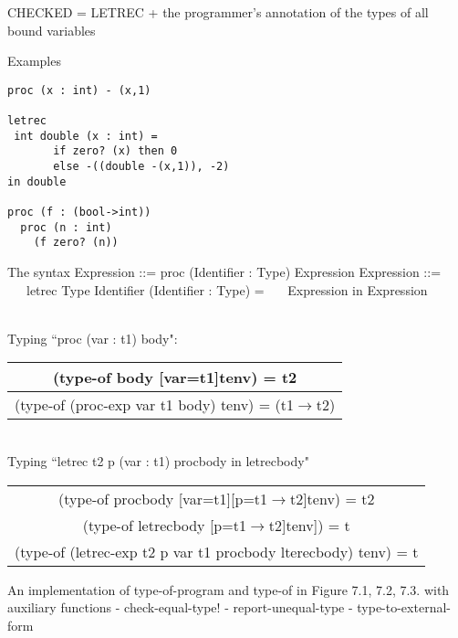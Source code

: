 \documentclass{article}
\begin{document}
\begin{huge}

CHECKED = LETREC + the programmer's annotation of the types of all bound variables

Examples
\begin{lstlisting}
proc (x : int) - (x,1)

letrec 
 int double (x : int) = 
       if zero? (x) then 0 
       else -((double -(x,1)), -2)
in double

proc (f : (bool->int)) 
  proc (n : int) 
    (f zero? (n))
\end{lstlisting}



The syntax \al
Expression ::= proc (Identifier : Type) Expression 
          \al
Expression ::=  \al
        \ \ \ letrec Type Identifier (Identifier : Type) = \al
        \ \ \ Expression in Expression \al
        \ \ \ \ \ \  


Typing ``proc (var : t1) body":

\begin{tabular}{c}
(type-of body [var=t1]tenv) = t2  \\ \hline
(type-of (proc-exp var t1 body) tenv) = (t1$\rightarrow$t2)
\end{tabular}

\ \\

Typing ``letrec t2 p (var : t1) procbody in letrecbody"

\begin{tabular}{c}
(type-of procbody [var=t1][p=t1$\rightarrow$t2]tenv) = t2  \\ 
(type-of letrecbody [p=t1$\rightarrow$t2]tenv]) = t \\ \hline
(type-of (letrec-exp t2 p var t1 procbody lterecbody) tenv) = t
\end{tabular}


An implementation of type-of-program and type-of in Figure 7.1, 7.2, 7.3. with auxiliary 
functions \al
- check-equal-type! \al
- report-unequal-type \al
- type-to-external-form


\end{huge}
\end{document}
